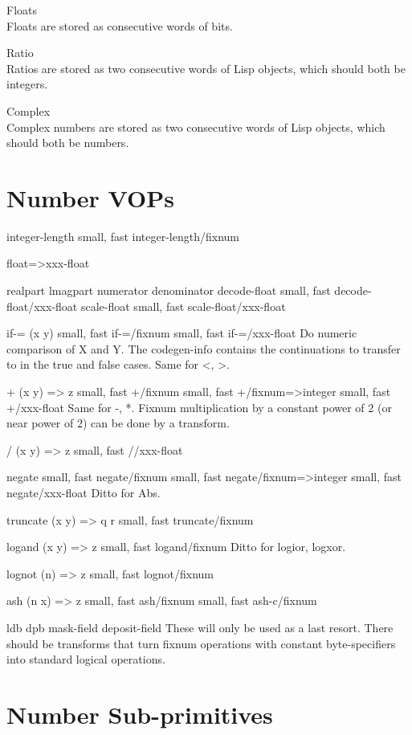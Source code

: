 {
Floats\\Floats are stored as consecutive words of bits.

Ratio\\Ratios are stored as two consecutive words of Lisp objects, which should
both be integers.

Complex\\Complex numbers are stored as two consecutive words of Lisp objects,
which should both be numbers.



\section{Number VOPs}

integer-length
{small, fast} integer-length/fixnum

float=>xxx-float

realpart
lmagpart
numerator
denominator
decode-float
{small, fast} decode-float/xxx-float
scale-float
{small, fast} scale-float/xxx-float

if-= (x y)
{small, fast} if-=/fixnum
{small, fast} if-=/xxx-float
    Do numeric comparison of X and Y.  The codegen-info contains the
    continuations to transfer to in the true and false cases.  Same for <, >.

+ (x y) => z
{small, fast} +/fixnum
{small, fast} +/fixnum=>integer
{small, fast} +/xxx-float
    Same for -, *.   Fixnum multiplication by a constant power of 2 (or near
    power of 2) can be done by a transform.

/ (x y) => z
{small, fast} //xxx-float

negate
{small, fast} negate/fixnum
{small, fast} negate/fixnum=>integer
{small, fast} negate/xxx-float
    Ditto for Abs.

truncate (x y) => q r
{small, fast} truncate/fixnum

logand (x y) => z
{small, fast} logand/fixnum
    Ditto for logior, logxor.
    
lognot (n) => z
{small, fast} lognot/fixnum

ash (n x) => z
{small, fast} ash/fixnum
{small, fast} ash-c/fixnum

ldb
dpb
mask-field
deposit-field
    These will only be used as a last resort.  There should be transforms that
    turn fixnum operations with constant byte-specifiers into standard logical
    operations.


\section{Number Sub-primitives}


}
